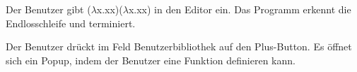 \documentclass[parskip=full,11pt,twoside]{scrartcl}
\begin{document}
{Der Benutzer gibt ($\lambda$x.xx)($\lambda$x.xx) in den Editor ein.}
{Das Programm erkennt die Endlosschleife und terminiert.}

{Der Benutzer drückt im Feld Benutzerbibliothek auf den Plus-Button.}
{Es öffnet sich ein Popup, indem der Benutzer eine Funktion definieren kann.}





\end{document}
